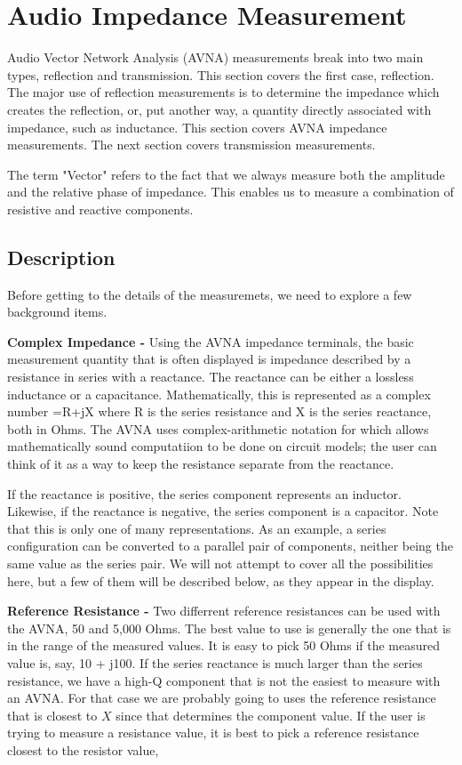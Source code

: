 \section{Audio Impedance Measurement}
%
Audio Vector Network Analysis (AVNA) measurements break into two main types,  reflection and transmission.  This section covers the first case, reflection.  The major use of reflection measurements is to determine the impedance
which creates the reflection, or, put another way, a quantity directly associated with impedance, such as inductance. This section covers AVNA impedance measurements. The next section covers transmission measurements.

The term "Vector" refers to the fact that we always measure both the amplitude and the relative phase of impedance.  This enables us to measure a combination of resistive and reactive components.
%
\subsection{Description}
Before getting to the details of the measuremets, we need to explore a few background items.

\textbf{Complex Impedance - }Using the AVNA impedance terminals, the basic measurement quantity that is often displayed is impedance described by a resistance in series with a reactance. The reactance can be either a lossless inductance or a capacitance. Mathematically, this is represented as a complex number =R+jX where R is the series resistance and X is the series reactance, both in Ohms. The AVNA uses complex-arithmetic notation for  which allows mathematically sound computatiion to be done on circuit models; the user can think of it as a way to keep the resistance separate from the reactance.

If the reactance is positive, the series component represents an inductor. Likewise, if the reactance is negative, the series component is a capacitor.  Note that this is only one of many representations. As an example, a series configuration can be converted to a parallel pair of components, neither being the same value as the series pair.  We will not attempt to cover all the possibilities here, but a few of them will be described below, as they appear in the display.

\textbf{Reference Resistance - }Two differrent reference resistances can be used with the AVNA, 50 and 5,000 Ohms. The best value to use is generally the one that is in the range of the measured values. It is easy to pick 50 Ohms if the measured value is, say, 10 + j100. If the series reactance is much larger than the series resistance, we have a high-Q component that is not the easiest to measure with an AVNA. For that case we are probably going to uses the reference resistance that is closest to \(X\) since that determines the component value. If the user is trying to measure a resistance value, it is best to pick a reference resistance closest to the resistor value,

